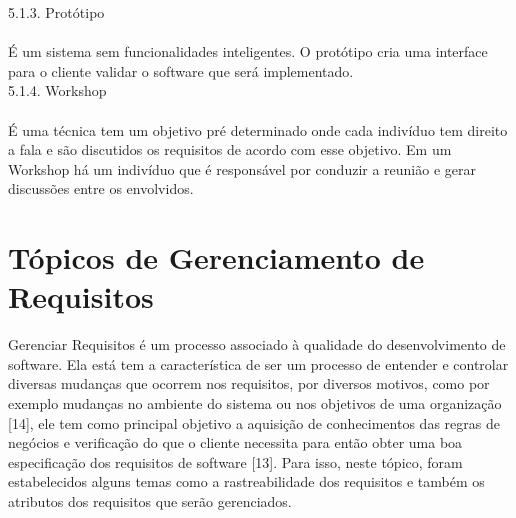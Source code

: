 {\large{5.1.3. Protótipo}}\\ \\
\tab É um sistema sem funcionalidades inteligentes. O protótipo cria uma interface para o cliente validar o software que será implementado.\\

{\large{5.1.4. Workshop}}\\ \\
\tab É uma técnica tem um objetivo pré determinado onde cada indivíduo tem direito a fala e são discutidos os requisitos de acordo com esse objetivo. Em um Workshop há um indivíduo que é responsável por conduzir a reunião e gerar discussões entre os envolvidos.\\

\label{sec:nova_sess_o}

\section{Tópicos de Gerenciamento de Requisitos}
\label{sec:nova_sess_o}

\tab Gerenciar Requisitos é um processo associado à qualidade do desenvolvimento de software. Ela está tem a característica de ser um processo de entender e controlar diversas mudanças que ocorrem nos requisitos, por diversos motivos, como por exemplo mudanças no ambiente do sistema ou nos objetivos de uma organização [14], ele tem como principal objetivo a aquisição de conhecimentos das regras de negócios e verificação do que o cliente necessita para então obter uma boa especificação dos requisitos de software [13]. Para isso, neste tópico, foram estabelecidos alguns temas como a rastreabilidade dos requisitos e também os atributos dos requisitos que serão gerenciados.\\

